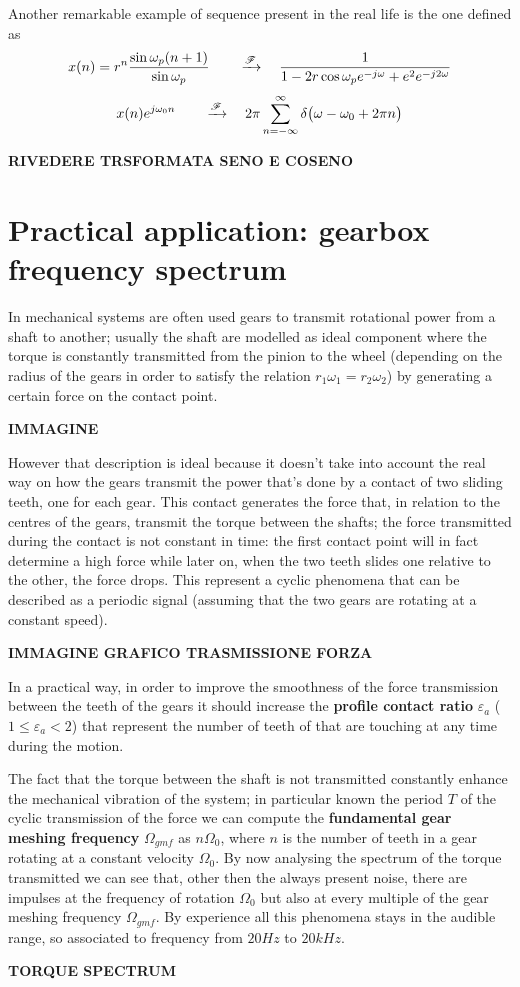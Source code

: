 		Another remarkable example of sequence present in the real life is the one defined as
		\[ x(n) = r^n \frac{\sin\omega_p(n+1)}{\sin\omega_p} \qquad \xrightarrow{\mathscr F} \quad \frac{1}{1 - 2 r\cos\omega_p e^{-j\omega} + e^2 e^{-j2\omega} }   \]
		\[ x(n) e^{j\omega_0 n}  \qquad \xrightarrow{\mathscr F} \quad2\pi \sum_{n=-\infty}^\infty \delta \big(\omega - \omega_0 + 2\pi n\big) \]
		
		\textbf{RIVEDERE TRSFORMATA SENO E COSENO}
		
\section{Practical application: gearbox frequency spectrum}
	In mechanical systems are often used gears to transmit rotational power from a shaft to another; usually the shaft are modelled as ideal component where the torque is constantly transmitted from the pinion to the wheel (depending on the radius of the gears in order to satisfy the relation $r_1 \omega_1 = r_2 \omega_2$) by generating a certain force on the contact point.
	
	\textbf{IMMAGINE}
	
	However that description is ideal because it doesn't take into account the real way on how the gears transmit the power that's done by a contact of two sliding teeth, one for each gear. This contact generates the force that, in relation to the centres of the gears, transmit the torque between the shafts; the force transmitted during the contact is not constant in time: the first contact point will in fact determine a high force while later on, when the two teeth slides one relative to the other, the force drops. This represent a cyclic phenomena that can be described as a periodic signal (assuming that the two gears are rotating at a constant speed).
	
	\textbf{IMMAGINE GRAFICO TRASMISSIONE FORZA}
	
	In a practical way, in order to improve the smoothness of the force transmission between the teeth of the gears it should increase the \textbf{profile contact ratio} $\varepsilon_a$ ($1\leq \varepsilon_a < 2$) that represent the number of teeth of that are touching at any time during the motion.
	
	The fact that the torque between the shaft is not transmitted constantly enhance the mechanical vibration of the system;  in particular known the period $T$ of the cyclic transmission of the force we can compute the \textbf{fundamental gear meshing frequency} $\Omega_{gmf}$ as $n \Omega_0$, where $n$ is the number of teeth in a gear rotating at a constant velocity $\Omega_0$. By now analysing the spectrum of the torque transmitted we can see that, other then the always present noise, there are impulses at the frequency of rotation $\Omega_0$ but also at every multiple of the gear meshing frequency $\Omega_{gmf}$. By experience all this phenomena stays in the audible range, so associated to frequency from $20Hz$ to $20kHz$.
	
	\textbf{TORQUE SPECTRUM}
	
	
	
	
	
	
	
	
	
	
	
	
	
	
	
	
	
	